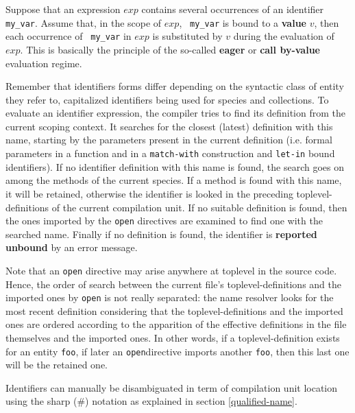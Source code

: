 Suppose that an expression $exp$ contains several occurrences of an
identifier {\tt my\_var}.  Assume that, in the scope of $exp$, {\tt
  my\_var} is bound to a {\bf value} $v$, then each occurrence of {\tt
  my\_var} in $exp$ is substituted by $v$ during the evaluation of
$exp$. This is basically the principle of the so-called {\bf eager} or
{\bf call by-value} evaluation regime.


\medskip
{}
Remember that identifiers forms differ depending on the syntactic
class of entity they refer to, capitalized identifiers being used for
species and collections.  To evaluate an identifier expression, the
{\focal} compiler tries to find its definition from the current scoping
context.   
 It searches for the closest (latest) definition with this name,
starting by the parameters present in the current definition
(i.e. formal parameters in a function and in a {\tt match-with}
construction and {\tt let-in} bound identifiers). If no identifier
definition with this name is found, the search goes on among the
methods of the current species. If a method is found with this name,
it will be retained, otherwise the identifier is looked in the
preceding toplevel-definitions of the current compilation unit.
\label{identifier-scoping-and-open}
 If no suitable definition is found, then the
ones imported by the {\tt open} directives are examined to find one
with the searched name. Finally if no definition is found, the
identifier is {\bf reported unbound} by an error message.

 Note that an
{\tt open} directive may arise anywhere at toplevel in the source
code. Hence, the order of search between the current file's
toplevel-definitions and the imported ones by {\tt open} is not really
separated: the name resolver looks for the most recent definition
considering that the toplevel-definitions and the imported ones are
ordered according to the apparition of the effective definitions in
the file themselves and the imported ones. In other words, if a
toplevel-definition exists for an entity {\tt foo}, if later an
{\tt open}directive imports another {\tt foo}, then this last one
will be the retained one.

\medskip

\medskip
{}

Identifiers can manually be disambiguated in term of compilation unit
location using the sharp (\#) notation as explained in section
\ref{qualified-name}.

